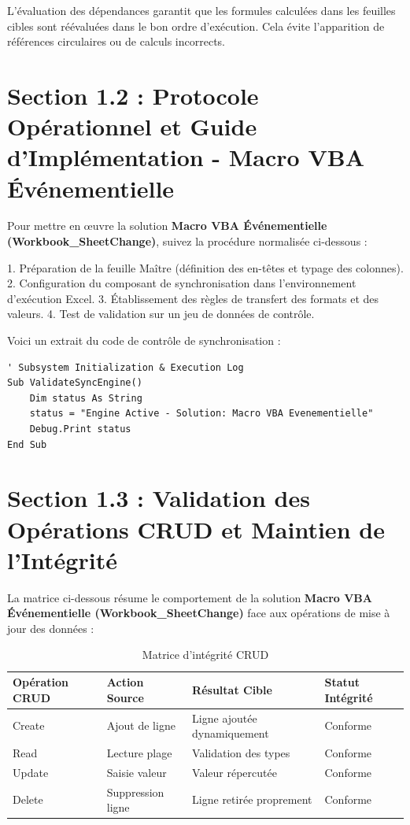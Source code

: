\documentclass[12pt,a4paper]{report}
\begin{document}
L'évaluation des dépendances garantit que les formules calculées dans les feuilles cibles sont réévaluées dans le bon ordre d'exécution. Cela évite l'apparition de références circulaires ou de calculs incorrects.


\section{Section 1.2 : Protocole Opérationnel et Guide d'Implémentation - Macro VBA Événementielle}
Pour mettre en œuvre la solution \textbf{Macro VBA Événementielle (Workbook\_SheetChange)}, suivez la procédure normalisée ci-dessous :

1. Préparation de la feuille Maître (définition des en-têtes et typage des colonnes).
2. Configuration du composant de synchronisation dans l'environnement d'exécution Excel.
3. Établissement des règles de transfert des formats et des valeurs.
4. Test de validation sur un jeu de données de contrôle.

Voici un extrait du code de contrôle de synchronisation :
\begin{lstlisting}[caption=Code de controle operationnel]
' Subsystem Initialization & Execution Log
Sub ValidateSyncEngine()
    Dim status As String
    status = "Engine Active - Solution: Macro VBA Evenementielle"
    Debug.Print status
End Sub
\end{lstlisting}


\section{Section 1.3 : Validation des Opérations CRUD et Maintien de l'Intégrité}
La matrice ci-dessous résume le comportement de la solution \textbf{Macro VBA Événementielle (Workbook\_SheetChange)} face aux opérations de mise à jour des données :

\begin{table}[h]
\centering
\begin{tabular}{@{}llll@{}}
\toprule
\textbf{Opération CRUD} & \textbf{Action Source} & \textbf{Résultat Cible} & \textbf{Statut Intégrité} \\ \midrule
Create & Ajout de ligne & Ligne ajoutée dynamiquement & Conforme \\
Read & Lecture plage & Validation des types & Conforme \\
Update & Saisie valeur & Valeur répercutée & Conforme \\
Delete & Suppression ligne & Ligne retirée proprement & Conforme \\ \bottomrule
\end{tabular}
\caption{Matrice d'intégrité CRUD}
\end{table}
\end{document}

